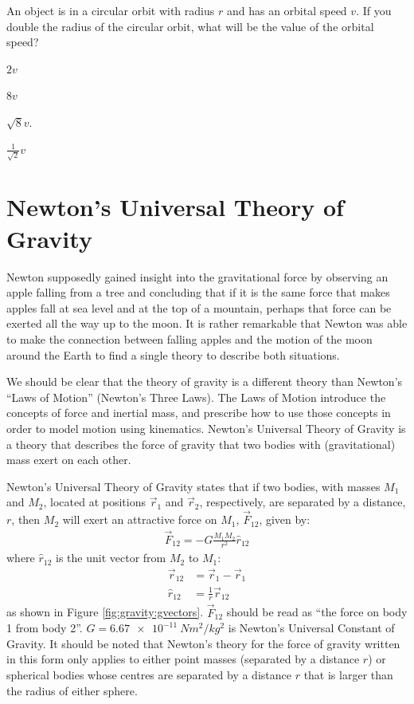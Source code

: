 \begin{checkpoint}
\begin{MCquestion}{An object is in a circular orbit with radius $r$ and has an orbital speed $v$. If you double the radius of the circular orbit, what will be the value of the orbital speed?}
\item $2v$
\item $8v$
\item $\sqrt{8}v$.
\item $\frac{1}{\sqrt{2}}v$ \correct
\end{MCquestion}
\end{checkpoint}

\section{Newton's Universal Theory of Gravity}
Newton supposedly gained insight into the gravitational force by observing an apple falling from a tree and concluding that if it is the same force that makes apples fall at sea level and at the top of a mountain, perhaps that force can be exerted all the way up to the moon. It is rather remarkable that Newton was able to make the connection between falling apples and the motion of the moon around the Earth to find a single theory to describe both situations.

We should be clear that the theory of gravity is a different theory than Newton's ``Laws of Motion'' (Newton's Three Laws). The Laws of Motion introduce the concepts of force and inertial mass, and prescribe how to use those concepts in order to model motion using kinematics. Newton's Universal Theory of Gravity is a theory that describes the force of gravity that two bodies with (gravitational) mass exert on each other.

Newton's Universal Theory of Gravity states that if two bodies, with masses $M_1$ and $M_2$, located at positions $\vec r_1$ and $\vec r_2$, respectively, are separated by a distance, $r$, then $M_2$ will exert an attractive force on $M_1$, $\vec F_{12}$, given by:
\begin{align}
\vec F_{12}=-G\frac{M_1M_2}{r^2}\hat r_{12}
\end{align}
where $\hat r_{12}$ is the unit vector from $M_2$ to $M_1$:
\begin{align*}
\vec r_{12} &= \vec r_1 - \vec r_1\\
\hat r_{12} &= \frac{1}{r} \vec r_{12}
\end{align*}
as shown in Figure \ref{fig:gravity:gvectors}. $\vec F_{12}$ should be read as ``the force on body 1 from body 2''. $G=\SI{6.67e-11}{Nm^2/kg^2}$ is Newton's Universal Constant of Gravity. It should be noted that Newton's theory for the force of gravity written in this form only applies to either point masses (separated by a distance $r$) or spherical bodies whose centres are separated by a distance $r$ that is larger than the radius of either sphere.

